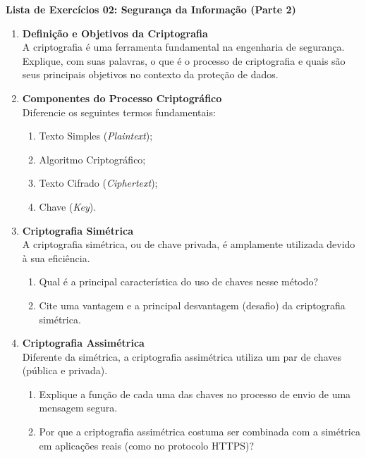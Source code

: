 \documentclass[12pt]{article}
\begin{document}
\begin{center}
    \textcolor{meuazul}{\Large \textbf{Lista de Exercícios 02: Segurança da Informação (Parte 2)}}
\end{center}

\vspace{0.5cm}

\begin{enumerate}[label=\textbf{Questão \arabic*:}, leftmargin=1.5cm, labelsep=0.5cm]

    \item \textbf{Definição e Objetivos da Criptografia} \\
    A criptografia é uma ferramenta fundamental na engenharia de segurança. Explique, com suas palavras, o que é o processo de criptografia e quais são seus principais objetivos no contexto da proteção de dados.

    \item \textbf{Componentes do Processo Criptográfico} \\
    Diferencie os seguintes termos fundamentais:
    \begin{enumerate}[label=\alph*)]
        \item Texto Simples (\textit{Plaintext});
        \item Algoritmo Criptográfico;
        \item Texto Cifrado (\textit{Ciphertext});
        \item Chave (\textit{Key}).
    \end{enumerate}

    \item \textbf{Criptografia Simétrica} \\
    A criptografia simétrica, ou de chave privada, é amplamente utilizada devido à sua eficiência.
    \begin{enumerate}[label=\alph*)]
        \item Qual é a principal característica do uso de chaves nesse método?
        \item Cite uma vantagem e a principal desvantagem (desafio) da criptografia simétrica.
    \end{enumerate}

    \item \textbf{Criptografia Assimétrica} \\
    Diferente da simétrica, a criptografia assimétrica utiliza um par de chaves (pública e privada).
    \begin{enumerate}[label=\alph*)]
        \item Explique a função de cada uma das chaves no processo de envio de uma mensagem segura.
        \item Por que a criptografia assimétrica costuma ser combinada com a simétrica em aplicações reais (como no protocolo HTTPS)?
    \end{enumerate}


\end{enumerate}
\end{document}
